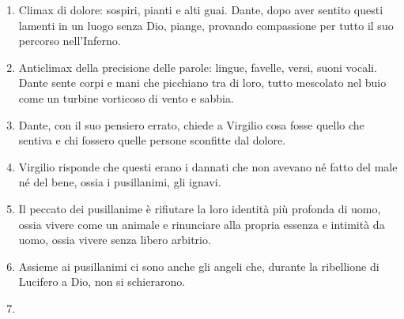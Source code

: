 \documentclass{article}
\begin{document}
\begin{enumerate}
    \item 
    Climax di dolore: sospiri, pianti e alti guai. Dante, dopo aver sentito questi lamenti in un luogo senza Dio, piange, provando compassione per tutto il suo percorso nell'Inferno.
    \item 
    Anticlimax della precisione delle parole: lingue, favelle, versi, suoni vocali. Dante sente corpi e mani che picchiano tra di loro, tutto mescolato nel buio come un turbine vorticoso di vento e sabbia.
    \item 
    Dante, con il suo pensiero errato, chiede a Virgilio cosa fosse quello che sentiva e chi fossero quelle persone sconfitte dal dolore.
    \item Virgilio risponde che questi erano i dannati che non avevano né fatto del male né del bene, ossia i pusillanimi, gli ignavi.
    \item Il peccato dei pusillanime è rifiutare la loro identità più profonda di uomo, ossia vivere come un animale e rinunciare alla propria essenza e intimità da uomo, ossia vivere senza libero arbitrio.
    \item 
    Assieme ai pusillanimi ci sono anche gli angeli che, durante la ribellione di Lucifero a Dio, non si schierarono.
    \item 
\end{enumerate}
\end{document}
